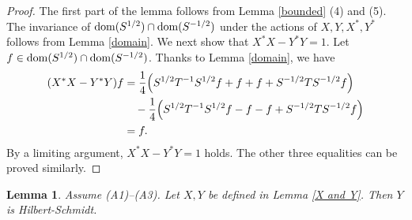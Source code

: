 \documentclass[12pt]{article}
\theoremstyle{plain}
\newtheorem{lem}[theorem]{\bf Lemma}
\numberwithin{equation}{section}
\theoremstyle{remark}
\begin{document}
\begin{proof}
The first part of the lemma follows from Lemma \ref{bounded} (4) and (5).
The invariance of $\mathop{\mathrm{dom}}(S^{1/2})\cap\mathop{\mathrm{dom}}(S^{-1/2})$ under the actions of $X, Y, X^*, Y^*$ follows from Lemma \ref{domain}.
We next show that $X^*X-Y^*Y=1$.
Let $f\in\mathop{\mathrm{dom}}(S^{1/2})\cap\mathop{\mathrm{dom}}(S^{-1/2})$.
Thanks to Lemma \ref{domain}, we have
\begin{align*}
 (X^*X-Y^*Y)f
 &= \frac{1}{4}\Bigl(S^{1/2}T^{-1}S^{1/2}f+f+f+S^{-1/2}TS^{-1/2}f\Bigr)\\
 &  \quad -\frac{1}{4}\Bigl(S^{1/2}T^{-1}S^{1/2}f-f-f+S^{-1/2}TS^{-1/2}f\Bigr)\\
 &= f.
\end{align*}
By a limiting argument, $X^*X-Y^*Y=1$ holds.
The other three equalities can be proved similarly.
\end{proof}

\begin{lem}\label{Y is HS}
Assume (A1)--(A3). Let $X,Y$ be defined in Lemma \ref{X and Y}.
Then $Y$ is Hilbert-Schmidt.
\end{lem}
\end{document}
